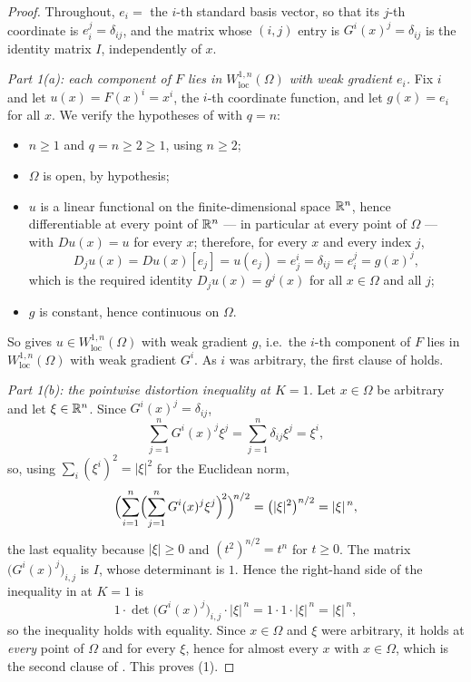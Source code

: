 \begin{proof}
Throughout, $e_i=$ the $i$-th standard basis vector, so that its $j$-th
coordinate is $e_i^j=\delta_{ij}$, and the matrix whose $(i,j)$ entry is
$G^i(x)^j=\delta_{ij}$ is the identity matrix $I$, independently of $x$.

\emph{Part 1(a): each component of $F$ lies in $W^{1,n}_{\mathrm{loc}}(\Omega)$
with weak gradient $e_i$.}  Fix $i$ and let $u(x)=F(x)^i=x^i$, the $i$-th
coordinate function, and let $g(x)=e_i$ for all $x$.  We verify the hypotheses of
 with $q=n$:
\begin{itemize}
\item $n\ge1$ and $q=n\ge2\ge1$, using $n\ge2$;
\item $\Omega$ is open, by hypothesis;
\item $u$ is a linear functional on the finite-dimensional space $\mathbb{R}^n$, hence
  differentiable at every point of $\mathbb{R}^n$ --- in particular at every point of
  $\Omega$ --- with $Du(x)=u$ for every $x$; therefore, for every $x$ and every
  index $j$,
  \[
  D_ju(x)=Du(x)[e_j]=u(e_j)=e_j^i=\delta_{ij}=e_i^j=g(x)^j ,
  \]
  which is the required identity $D_ju(x)=g^j(x)$ for all $x\in\Omega$ and all
  $j$;
\item $g$ is constant, hence continuous on $\Omega$.
\end{itemize}
So  gives
$u\in W^{1,n}_{\mathrm{loc}}(\Omega)$ with weak gradient $g$, i.e.\ the $i$-th
component of $F$ lies in $W^{1,n}_{\mathrm{loc}}(\Omega)$ with weak gradient
$G^i$.  As $i$ was arbitrary, the first clause of 
holds.

\emph{Part 1(b): the pointwise distortion inequality at $K=1$.}  Let
$x\in\Omega$ be arbitrary and let $\xi\in\mathbb{R}^n$.  Since $G^i(x)^j=\delta_{ij}$,
\[
\sum_{j=1}^nG^i(x)^j\xi^j=\sum_{j=1}^n\delta_{ij}\xi^j=\xi^i ,
\]
so, using $\sum_i(\xi^i)^2=|\xi|^2$ for the Euclidean norm,
\[
\Bigl(\sum_{i=1}^n\Bigl(\sum_{j=1}^nG^i(x)^j\xi^j\Bigr)^{\!2}\Bigr)^{\!n/2}
=\bigl(|\xi|^2\bigr)^{n/2}=|\xi|^{\,n},
\]
the last equality because $|\xi|\ge0$ and $(t^2)^{n/2}=t^n$ for $t\ge0$.  The
matrix $\bigl(G^i(x)^j\bigr)_{i,j}$ is $I$, whose determinant is $1$.  Hence the
right-hand side of the inequality in  at $K=1$ is
\[
1\cdot\det\bigl(G^i(x)^j\bigr)_{i,j}\cdot|\xi|^{\,n}=1\cdot1\cdot|\xi|^{\,n}
=|\xi|^{\,n},
\]
so the inequality holds with equality.  Since $x\in\Omega$ and $\xi$ were
arbitrary, it holds at \emph{every} point of $\Omega$ and for every $\xi$, hence
for almost every $x$ with $x\in\Omega$, which is the second clause of
.  This proves (1).


\end{proof}
